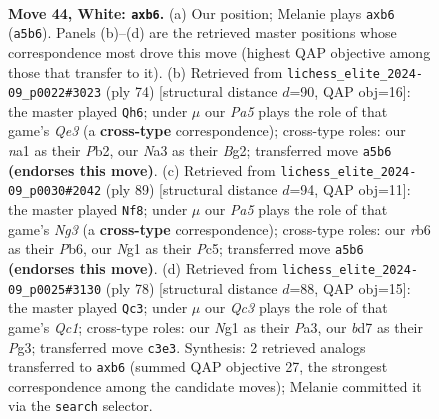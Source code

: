 \documentclass[11pt]{article}
\begin{document}
\clearpage

\begin{figure}[p]\centering
\begin{subfigure}{0.46\textwidth}\centering
\resizebox{\linewidth}{!}{%
\newchessgame
\chessboard[
  setfen={B2qn3/3b2k1/pr6/P3Pp1p/3P2p1/N1Q5/5PPP/n3K1N1 w - - 0 44},
  showmover=false,
  pgfstyle=straightmove, color=movearrow, markmove={a5-b6}
]}
\caption{}
\end{subfigure}\hfill
\begin{subfigure}{0.46\textwidth}\centering
\resizebox{\linewidth}{!}{%
\newchessgame
\chessboard[
  setfen={5rk1/3q4/4pbp1/4p2p/3nP2P/2R1Q1P1/1P4BK/8 w - - 1 38},
  showmover=false,
  pgfstyle=straightmove, color=movearrow, markmove={e3-h6}
]}
\caption{}
\end{subfigure}
\\[4pt]
\begin{subfigure}{0.46\textwidth}\centering
\resizebox{\linewidth}{!}{%
\newchessgame
\chessboard[
  setfen={6k1/6p1/1p1P2n1/2p2p2/p1P3qp/P1B5/1P2NK1Q/8 b - - 0 45},
  showmover=false,
  pgfstyle=straightmove, color=movearrow, markmove={g6-f8}
]}
\caption{}
\end{subfigure}\hfill
\begin{subfigure}{0.46\textwidth}\centering
\resizebox{\linewidth}{!}{%
\newchessgame
\chessboard[
  setfen={b2q2k1/5pp1/p2bp2p/Np2n3/1P1BP3/P5PP/5P2/1BQ2K2 w - - 3 40},
  showmover=false,
  pgfstyle=straightmove, color=movearrow, markmove={c1-c3}
]}
\caption{}
\end{subfigure}
\caption{\textbf{Move 44, White: \texttt{axb6}.} (a) Our position; Melanie plays \texttt{axb6} (\texttt{a5b6}). Panels (b)--(d) are the retrieved master positions whose correspondence most drove this move (highest QAP objective among those that transfer to it). (b) Retrieved from \texttt{lichess\_elite\_2024-09\_p0022\#3023} (ply 74) [structural distance $d$=90, QAP obj=16]: the master played \texttt{Qh6}; under $\mu$ our \emph{Pa5} plays the role of that game's \emph{Qe3} (a \textbf{cross-type} correspondence); cross-type roles: our \emph{n}a1 as their \emph{P}b2, our \emph{N}a3 as their \emph{B}g2; transferred move \texttt{a5b6} \textbf{(endorses this move)}. (c) Retrieved from \texttt{lichess\_elite\_2024-09\_p0030\#2042} (ply 89) [structural distance $d$=94, QAP obj=11]: the master played \texttt{Nf8}; under $\mu$ our \emph{Pa5} plays the role of that game's \emph{Ng3} (a \textbf{cross-type} correspondence); cross-type roles: our \emph{r}b6 as their \emph{P}b6, our \emph{N}g1 as their \emph{P}c5; transferred move \texttt{a5b6} \textbf{(endorses this move)}. (d) Retrieved from \texttt{lichess\_elite\_2024-09\_p0025\#3130} (ply 78) [structural distance $d$=88, QAP obj=15]: the master played \texttt{Qc3}; under $\mu$ our \emph{Qc3} plays the role of that game's \emph{Qc1}; cross-type roles: our \emph{N}g1 as their \emph{P}a3, our \emph{b}d7 as their \emph{P}g3; transferred move \texttt{c3e3}. Synthesis: 2 retrieved analogs transferred to \texttt{axb6} (summed QAP objective 27, the strongest correspondence among the candidate moves); Melanie committed it via the \texttt{search} selector.}
\label{fig:thought-m86}
\end{figure}
\end{document}
